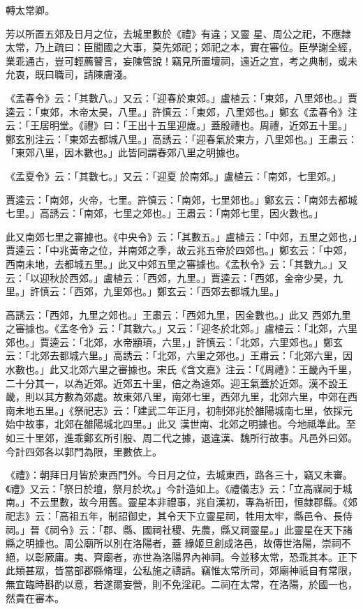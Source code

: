 \begin{pinyinscope}
 轉太常卿。



 芳以所置五郊及日月之位，去城里數於《禮》有違；又靈
 星、周公之祀，不應隸太常，乃上疏曰：臣聞國之大事，莫先郊祀；郊祀之本，實在審位。臣學謝全經，業乖通古，豈可輕薦瞽言，妄陳管說！竊見所置壇祠，遠近之宜，考之典制，或未允衷，既曰職司，請陳膚淺。



 《孟春令》云：「其數八。」又云：「迎春於東郊。」盧植云：「東郊，八里郊也。」賈逵云：「東郊，木帝太昊，八里。」許慎云：「東郊，八里郊也。」鄭玄《孟春令》注云：「王居明堂。《禮》曰：「王出十五里迎歲。」蓋殷禮也。周禮，近郊五十里。」鄭玄別注云：「東郊去都城八里。」高誘云：「迎春氣於東方，八里郊也。」王肅云：「東郊八里，因木數也。」此皆同謂春郊八里之明據也。



 《孟夏令》云：「其數七。」又云：「迎夏
 於南郊。」盧植云：「南郊，七里郊。」



 賈逵云：「南郊，火帝，七里。許慎云：「南郊，七里郊也。」鄭玄云：「南郊去都城七里。」高誘云：「南郊，七里之郊也。」王肅云：「南郊七里，因火數也。」



 此又南郊七里之審據也。《中央令》云：「其數五。」盧植云：「中郊，五里之郊也，」賈逵云：「中兆黃帝之位，并南郊之季，故云兆五帝於四郊也。」鄭玄云：「中郊，西南未地，去都城五里。」此又中郊五里之審據也。《孟秋令》云：「其數九。」又云：「以迎秋於西郊。」盧植云：「西郊，九里。」賈逵云：「西郊，金帝少昊，九里。」許慎云：「西郊，九里郊也。」鄭玄云：「西郊去都城九里。」



 高誘云：「西郊，九里之郊也。」王肅云：「西郊九里，因金數也。」此又
 西郊九里之審據也。《孟冬令》云：「其數六。」又云：「迎冬於北郊。」盧植云：「北郊，六里郊也。」賈逵云：「北郊，水帝顓頊，六里，」許慎云：「北郊，六里郊也。」鄭玄云：「北郊去都城六里。」高誘云：「北郊，六里之郊也。」王肅云：「北郊六里，因水數也。」此又北郊六里之審據也。宋氏《含文嘉》注云：「《周禮》：王畿內千里，二十分其一，以為近郊。近郊五十里，倍之為遠郊。迎王氣蓋於近郊。漢不設王畿，則以其方數為郊處。故東郊八里，南郊七里，西郊九里，北郊六里，中郊在西南未地五里。」《祭祀志》云：「建武二年正月，初制郊兆於雒陽城南七里，依採元始中故事，北郊在雒陽城北四里。」此又
 漢世南、北郊之明據也。今地祗準此。至如三十里郊，進乖鄭玄所引殷、周二代之據，退違漢、魏所行故事。凡邑外曰郊。今計四郊各以郭門為限，里數依上。



 《禮》：朝拜日月皆於東西門外。今日月之位，去城東西，路各三十，竊又未審。《禮》又云：「祭日於壇，祭月於坎。」今計造如上。《禮儀志》云：「立高禖祠于城南。」不云里數，故今用舊。靈星本非禮事，兆自漢初，專為祈田，恒隸郡縣。《郊祀志》云：「高祖五年，制詔御史，其令天下立靈星祠，牲用太牢，縣邑令、長侍祠。」晉《祠令》云：「郡、縣、國祠社稷、先農，縣又祠靈星。」此靈星在天下諸縣之明據也。周公廟所以別在洛陽者，蓋
 緣姬旦創成洛邑，故傳世洛陽，崇祠不絕，以彰厥庸。夷、齊廟者，亦世為洛陽界內神祠。今並移太常，恐乖其本。正下此類甚眾，皆當部郡縣脩理，公私施之禱請。竊惟太常所司，郊廟神祇自有常限，無宜臨時斟酌以意，若遂爾妄營，則不免淫祀。二祠在太常，在洛陽，於國一也，然貴在審本。




\end{pinyinscope}
